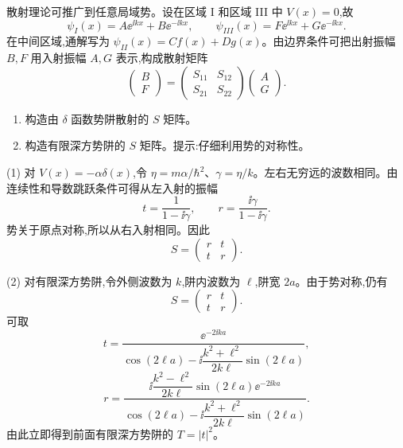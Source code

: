 \begin{question}
散射理论可推广到任意局域势。设在区域 I 和区域 III 中 $V(x)=0$,故
\[
\psi_I(x)=A\ee^{\ii kx}+B\ee^{-\ii kx},\qquad
\psi_{III}(x)=F\ee^{\ii kx}+G\ee^{-\ii kx}.
\]
在中间区域,通解写为 $\psi_{II}(x)=Cf(x)+Dg(x)$。由边界条件可把出射振幅 $B,F$ 用入射振幅 $A,G$ 表示,构成散射矩阵
\[
\begin{pmatrix}B\\F\end{pmatrix}=\begin{pmatrix}S_{11}&S_{12}\\S_{21}&S_{22}\end{pmatrix}
\begin{pmatrix}A\\G\end{pmatrix}.
\]
\begin{enumerate}
\item 构造由 $\delta$ 函数势阱散射的 $S$ 矩阵。
\item 构造有限深方势阱的 $S$ 矩阵。提示:仔细利用势的对称性。
\end{enumerate}
\begin{solution}
(1) 对 $V(x)=-\alpha\delta(x)$,令 $\eta=m\alpha/\hbar^2$、$\gamma=\eta/k$。左右无穷远的波数相同。由连续性和导数跳跃条件可得从左入射的振幅
\[
t=\frac1{1-\ii\gamma},
\qquad
r=\frac{\ii\gamma}{1-\ii\gamma}.
\]
势关于原点对称,所以从右入射相同。因此
\[
S=\begin{pmatrix}r&t\\t&r\end{pmatrix}.
\]

(2) 对有限深方势阱,令外侧波数为 $k$,阱内波数为 $\ell$,阱宽 $2a$。由于势对称,仍有
\[
S=\begin{pmatrix}r&t\\t&r\end{pmatrix}.
\]
可取
\[
t=\frac{\ee^{-2\ii ka}}{\cos(2\ell a)-\ii\dfrac{k^2+\ell^2}{2k\ell}\sin(2\ell a)},
\]
\[
r=\frac{\ii\dfrac{k^2-\ell^2}{2k\ell}\sin(2\ell a)\ee^{-2\ii ka}}
{\cos(2\ell a)-\ii\dfrac{k^2+\ell^2}{2k\ell}\sin(2\ell a)}.
\]
由此立即得到前面有限深方势阱的 $T=|t|^2$。
\end{solution}
\end{question}

